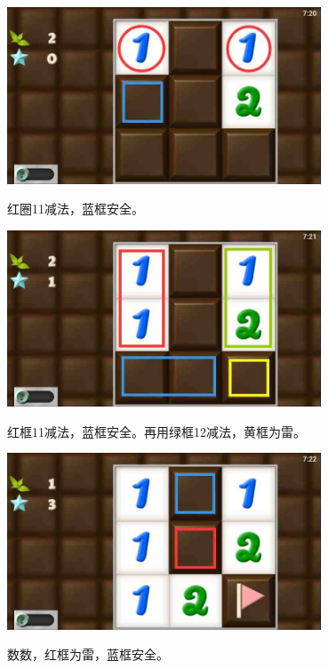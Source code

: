 \subsection{} %
\begin{center}
    \includegraphics[width=0.7\textwidth]{puzzlelow/4-1.jpg}
\end{center}
红圈11减法，蓝框安全。
\begin{center}
    \includegraphics[width=0.7\textwidth]{puzzlelow/4-2.jpg}
\end{center}
红框11减法，蓝框安全。再用绿框12减法，黄框为雷。
\begin{center}
    \includegraphics[width=0.7\textwidth]{puzzlelow/4-3.jpg}
\end{center}
数数，红框为雷，蓝框安全。

